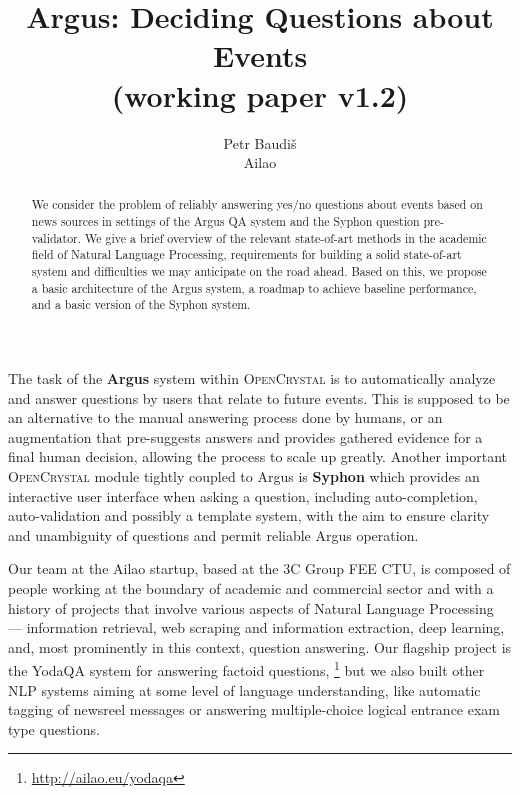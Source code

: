 \documentclass[11pt,a4paper]{article}
\title{Argus: Deciding Questions about Events \\ (working paper v1.2)}
\author{Petr Baudiš \\ Ailao}
\begin{document}
\maketitle

\begin{abstract}%
	We consider the problem of reliably answering yes/no questions
	about events based on news sources in settings of the Argus QA
	system and the Syphon question pre-validator.
	We give a brief overview of the relevant state-of-art methods
	in the academic field of Natural Language Processing,
	requirements for building a solid state-of-art system
	and difficulties we may anticipate on the road ahead.
	Based on this, we propose a basic architecture of the Argus
	system, a roadmap to achieve baseline performance, and a basic
	version of the Syphon system.
\end{abstract}

\vspace{3ex}

The task of the \textbf{Argus} system within \textsc{OpenCrystal}
is to automatically analyze and answer
questions by users that relate to future events.  This is supposed
to be an alternative to the manual answering process done by humans,
or an augmentation that pre-suggests answers and provides gathered
evidence for a final human decision, allowing the process to scale
up greatly.  Another important \textsc{OpenCrystal} module tightly
coupled to Argus is \textbf{Syphon} which provides an interactive
user interface when asking a question, including auto-completion,
auto-validation and possibly a template system, with the aim to
ensure clarity and unambiguity of questions and permit reliable
Argus operation.

Our team at the Ailao startup, based at the 3C Group FEE CTU,
is composed of people working at the boundary of academic and commercial
sector and with a history of projects that involve
various aspects of Natural Language Processing ---
information retrieval, web scraping and information extraction,
deep learning, and, most prominently in this context, question answering.
Our flagship project is the YodaQA system for answering factoid questions,%
\footnote{\url{http://ailao.eu/yodaqa}}
but we also built other NLP systems aiming at some level of language understanding,
like automatic tagging of newsreel messages
or answering multiple-choice logical entrance exam type questions.
\end{document}
